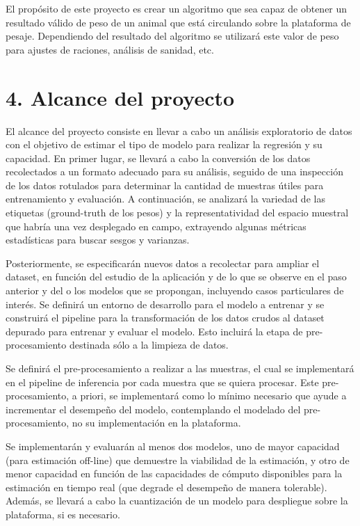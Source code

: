 \documentclass[
11pt, %
codirector, %
]{charter}
\begin{document}
El propósito de este proyecto es crear un algoritmo que sea capaz de obtener un resultado válido de peso de un animal que está circulando sobre la plataforma de pesaje. Dependiendo del resultado
del algoritmo se utilizará este valor de peso para ajustes de raciones, análisis de sanidad, etc.


\section{4. Alcance del proyecto}
\label{sec:alcance}


El alcance del proyecto consiste en llevar a cabo un análisis exploratorio de datos con el objetivo de estimar el tipo de modelo para realizar la regresión y su capacidad. En primer lugar, se llevará a cabo la conversión de los datos recolectados a un formato adecuado para su análisis, seguido de una inspección de los datos rotulados para determinar la cantidad de muestras útiles para entrenamiento y evaluación. A continuación, se analizará la variedad de las etiquetas (ground-truth de los pesos) y la representatividad del espacio muestral que habría una vez desplegado en campo, extrayendo algunas métricas estadísticas para buscar sesgos y varianzas.

Posteriormente, se especificarán nuevos datos a recolectar para ampliar el dataset, en función del estudio de la aplicación y de lo que se observe en el paso anterior y del o los modelos que se propongan, incluyendo casos particulares de interés. Se definirá un entorno de desarrollo para el modelo a entrenar y se construirá el pipeline para la transformación de los datos crudos al dataset depurado para entrenar y evaluar el modelo. Esto incluirá la etapa de pre-procesamiento destinada sólo a la limpieza de datos.

Se definirá el pre-procesamiento a realizar a las muestras, el cual se implementará en el pipeline de inferencia por cada muestra que se quiera procesar. Este pre-procesamiento, a priori, se implementará como lo mínimo necesario que ayude a incrementar el desempeño del modelo, contemplando el modelado del pre-procesamiento, no su implementación en la plataforma.

Se implementarán y evaluarán al menos dos modelos, uno de mayor capacidad (para estimación off-line) que demuestre la viabilidad de la estimación, y otro de menor capacidad en función de las capacidades de cómputo disponibles para la estimación en tiempo real (que degrade el desempeño de manera tolerable). Además, se llevará a cabo la cuantización de un modelo para despliegue sobre la plataforma, si es necesario.
\end{document}
